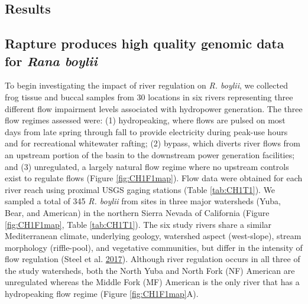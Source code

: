 \documentclass[twoside,12pt,final]{ucthesis-CA2012} %
\begin{document}
\begin{ucmainmatter}
\clearpage

\hypertarget{results}{%
\section{Results}\label{results}}

\hypertarget{rapture-produces-high-quality-genomic-data-for-rana-boylii}{%
\subsection{\texorpdfstring{Rapture produces high quality genomic data
for \emph{Rana
boylii}}{Rapture produces high quality genomic data for Rana boylii}}\label{rapture-produces-high-quality-genomic-data-for-rana-boylii}}

To begin investigating the impact of river regulation on \emph{R.
boylii}, we collected frog tissue and buccal samples from 30 locations
in six rivers representing three different flow impairment levels
associated with hydropower generation. The three flow regimes assessed
were: (1) hydropeaking, where flows are pulsed on most days from late
spring through fall to provide electricity during peak-use hours and for
recreational whitewater rafting; (2) bypass, which diverts river flows
from an upstream portion of the basin to the downstream power generation
facilities; and (3) unregulated, a largely natural flow regime where no
upstream controls exist to regulate flows (Figure \ref{fig:CH1F1map}).
Flow data were obtained for each river reach using proximal USGS gaging
stations (Table \ref{tab:CH1T1}). We sampled a total of 345 \emph{R.
boylii} from sites in three major watersheds (Yuba, Bear, and American)
in the northern Sierra Nevada of California (Figure \ref{fig:CH1F1map},
Table \ref{tab:CH1T1}). The six study rivers share a similar
Mediterranean climate, underlying geology, watershed aspect
(west-slope), stream morphology (riffle-pool), and vegetative
communities, but differ in the intensity of flow regulation (Steel et
al. \protect\hyperlink{ref-steel_associating_2017}{2017}). Although
river regulation occurs in all three of the study watersheds, both the
North Yuba and North Fork (NF) American are unregulated whereas the
Middle Fork (MF) American is the only river that has a hydropeaking flow
regime (Figure \ref{fig:CH1F1map}A).
\begin{table}[!h]


\end{table}
\end{ucmainmatter}
\end{document}
